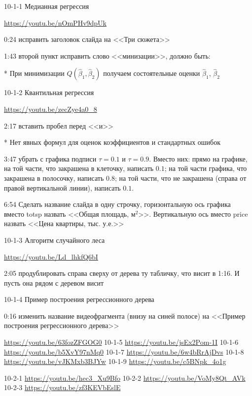 \documentclass[12pt,a4paper]{article}
\renewcommand{\b}{\beta}
\newcommand{\hb}{\hat{\b}}
\begin{document}
10-1-1 Медианная регрессия

\url{https://youtu.be/nOmPHv9dpUk}

0:24 исправить заголовок слайда на <<Три сюжета>>

1:43 второй пункт исправить слово <<минизации>>, должно быть:

* При минимизации $Q(\hb_1,\hb_2)$ получаем состоятельные оценки $\hb_1$, $\hb_2$


10-1-2 Квантильная регрессия

\url{https://youtu.be/zecZye4a0_8}

2:17 вставить пробел перед <<и>>

* Нет явных формул для оценок коэффициентов и стандартных ошибок

3:47 убрать с графика подписи $\tau=0.1$ и $\tau=0.9$. Вместо них: прямо на графике, на той части, что закрашена в клеточку, написать $0.1$; на той части графика, что закрашена в полосочку, написать $0.8$; на той части, что не закрашена (справа от правой вертикальной линии), написать $0.1$. 

6:54 Сделать название слайда в одну строчку, горизонтальную ось графика вместо totsp назвать <<Общая площадь, м$^2$>>. Вертикальную ось вместо price назвать <<Цена квартиры, тыс. у.е.>>


10-1-3 Алгоритм случайного леса

\url{https://youtu.be/Ld_lhkfQ6bI}

2:05 продублировать справа сверху от дерева ту табличку, что висит в 1:16. И пусть она рядом с деревом висит

10-1-4 Пример построения регрессионного дерева

0:16 изменить название видеофрагмента (внизу на синей полосе) на <<Пример построения регрессионного дерева>>

\url{https://youtu.be/63fozZFGOG0}
10-1-5 \url{https://youtu.be/jsEx2Pom-1I}
10-1-6 \url{https://youtu.be/b5XvY97nMq0}
10-1-7 \url{https://youtu.be/6w4bRrAjDvs}
10-1-8 \url{https://youtu.be/vJKMxb3BJYw}
10-1-9 \url{https://youtu.be/c5BNpk_4o1g}


10-2-1 \url{https://youtu.be/hec3_Xu9Bfo}
10-2-2 \url{https://youtu.be/VoMy8Qt_AVk}
10-2-3 \url{https://youtu.be/zf3KEVbEslE}
\end{document}
